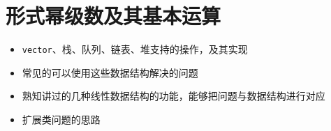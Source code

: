 \chapter{形式幂级数及其基本运算}

\begin{overview}
\begin{itemize}
    \item \texttt{vector}、栈、队列、链表、堆支持的操作，及其实现
    \item 常见的可以使用这些数据结构解决的问题
\end{itemize}
\end{overview}



\begin{summary}
\begin{itemize}
    \item 熟知讲过的几种线性数据结构的功能，能够把问题与数据结构进行对应
    \item 扩展类问题的思路
\end{itemize}
\end{summary}


